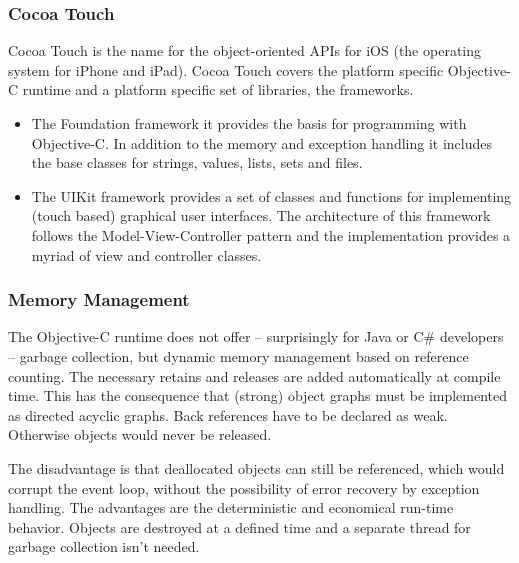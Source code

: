 \subsubsection{Cocoa Touch}
\label{sec:Cocoa}

Cocoa Touch is the name for the object-oriented APIs for iOS (the operating system for iPhone and iPad). 
Cocoa Touch covers the platform specific Objective-C runtime and a platform specific set of libraries, the frameworks.

\begin{itemize}
\item\label{secitem:CocoaFoundation}
The Foundation framework it provides the basis for programming with Objective-C. 
In addition to the memory and exception handling it includes the base classes for strings, values, lists, sets and files.
\item\label{secitem:CocoaUIKit} The UIKit framework provides a set of classes and functions for implementing (touch based) graphical user interfaces. 
The architecture of this framework follows the Model-View-Controller pattern 
and the implementation provides a myriad of view and controller classes.
\end{itemize}

\subsubsection{Memory Management}
\label{sec:MemoryManagement}
The Objective-C runtime does not offer – surprisingly for Java or C\# developers  – garbage collection, 
but dynamic memory management based on reference counting. 
The necessary retains and releases are added automatically at compile time.
This has the consequence that (strong) object graphs must be implemented as directed acyclic graphs. 
Back references have to be declared as weak.
Otherwise objects would never be released. 

The disadvantage is that deallocated objects can still be referenced, which would corrupt the event loop,
without the possibility of error recovery by exception handling.
The advantages are the deterministic and economical run-time behavior.
Objects are destroyed at a defined time and a separate thread for garbage collection isn't needed. 




